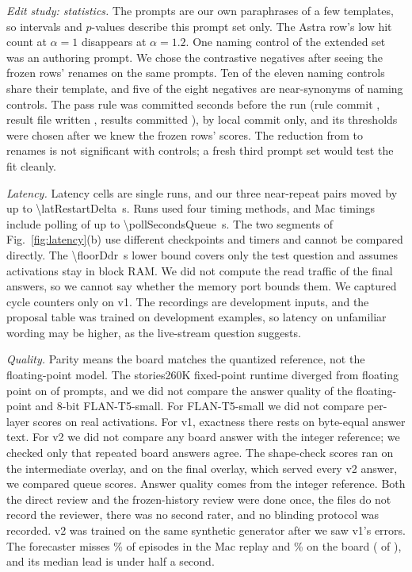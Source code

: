 \documentclass[conference,10pt,letterpaper]{IEEEtran}
\newcommand{\seconds}[1]{\SI{#1}{\second}}
\newcommand{\pct}[1]{#1\%}
\newcommand{\flan}{\mbox{FLAN-T5-small}}
\newcommand{\stories}{\mbox{stories260K}}
\newcommand{\eightbit}{\mbox{8-bit}}
\begin{document}
\emph{Edit study: statistics.} The prompts are our own paraphrases of a few templates, so intervals and $p$-values describe this prompt set only. The Astra row's low hit count at $\alpha=1$ disappears at $\alpha=1.2$. One naming control of the extended set was an authoring prompt. We chose the contrastive negatives after seeing the frozen rows' renames on the same prompts. Ten of the eleven naming controls share their template, and five of the eight negatives are near-synonyms of naming controls. The pass rule was committed seconds before the run (rule commit , result file written \contrastiveWrittenTime, results committed \resultTime), by local commit only, and its thresholds were chosen after we knew the frozen rows' scores. The reduction from \conventionalLeaks{} to \contrastiveLeaks{} renames is not significant with \extNaming{} controls; a fresh third prompt set would test the fit cleanly.

\emph{Latency.} Latency cells are single runs, and our three near-repeat pairs moved by up to \seconds{\latRestartDelta}. Runs used four timing methods, and Mac timings include polling of up to \seconds{\pollSecondsQueue}. The two segments of Fig.~\ref{fig:latency}(b) use different checkpoints and timers and cannot be compared directly. The \seconds{\floorDdr} lower bound covers only the test question and assumes activations stay in block RAM. We did not compute the read traffic of the final answers, so we cannot say whether the memory port bounds them. We captured cycle counters only on v1. The recordings are development inputs, and the proposal table was trained on development examples, so latency on unfamiliar wording may be higher, as the live-stream question suggests.

\emph{Quality.} Parity means the board matches the quantized reference, not the floating-point model. The \stories{} fixed-point runtime diverged from floating point on \fixedPointDiverged{} of \fixedPointPrompts{} prompts, and we did not compare the answer quality of the floating-point and \eightbit{} \flan. For \flan{} we did not compare per-layer scores on real activations. For v1, exactness there rests on byte-equal answer text. For v2 we did not compare any board answer with the integer reference; we checked only that repeated board answers agree. The \projectionArrayScores{} shape-check scores ran on the intermediate overlay, and on the final overlay, which served every v2 answer, we compared \queueScores{} queue scores. Answer quality comes from the integer reference. Both the direct review and the frozen-history review were done once, the files do not record the reviewer, there was no second rater, and no blinding protocol was recorded. v2 was trained on the same synthetic generator after we saw v1's errors. The forecaster misses \pct{\telemetryMissShare} of episodes in the Mac replay and \pct{\poolMissShare} on the board (\poolMissed{} of \poolEpisodes), and its median lead is under half a second.
\end{document}
